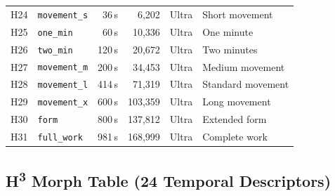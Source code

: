 \begin{longtable}{
  r
  l
  r
  r
  l
  l
}
\rowcolor{purple!8}
H24 & \texttt{movement\_s} & 36\,s      & 6{,}202    & Ultra & Short movement             \\
\rowcolor{purple!8}
H25 & \texttt{one\_min}    & 60\,s      & 10{,}336   & Ultra & One minute                 \\
\rowcolor{purple!8}
H26 & \texttt{two\_min}    & 120\,s     & 20{,}672   & Ultra & Two minutes                \\
\rowcolor{purple!8}
H27 & \texttt{movement\_m} & 200\,s     & 34{,}453   & Ultra & Medium movement            \\
\rowcolor{purple!8}
H28 & \texttt{movement\_l} & 414\,s     & 71{,}319   & Ultra & Standard movement          \\
\rowcolor{purple!8}
H29 & \texttt{movement\_x} & 600\,s     & 103{,}359  & Ultra & Long movement              \\
\rowcolor{purple!8}
H30 & \texttt{form}        & 800\,s     & 137{,}812  & Ultra & Extended form              \\
\rowcolor{purple!8}
H31 & \texttt{full\_work}  & 981\,s     & 168{,}999  & Ultra & Complete work              \\

\end{longtable}


\subsection{H\textsuperscript{3} Morph Table (24 Temporal Descriptors)}
\label{tab:h3-morph}

